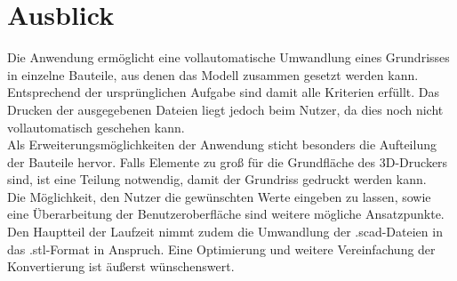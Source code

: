 \chapter{Ausblick}
Die Anwendung ermöglicht eine vollautomatische Umwandlung eines Grundrisses in einzelne Bauteile, aus denen das Modell zusammen gesetzt werden kann.
Entsprechend der ursprünglichen Aufgabe sind damit alle Kriterien erfüllt.
Das Drucken der ausgegebenen Dateien liegt jedoch beim Nutzer, da dies noch nicht vollautomatisch geschehen kann. \\

Als Erweiterungsmöglichkeiten der Anwendung sticht besonders die Aufteilung der Bauteile hervor.
Falls Elemente zu groß für die Grundfläche des 3D-Druckers sind, ist eine Teilung notwendig, damit der Grundriss gedruckt werden kann. \\

Die Möglichkeit, den Nutzer die gewünschten Werte eingeben zu lassen, sowie eine Überarbeitung der Benutzeroberfläche sind weitere mögliche Ansatzpunkte. \\

Den Hauptteil der Laufzeit nimmt zudem die Umwandlung der .scad-Dateien in das .stl-Format in Anspruch.
Eine Optimierung und weitere Vereinfachung der Konvertierung ist äußerst wünschenswert.

